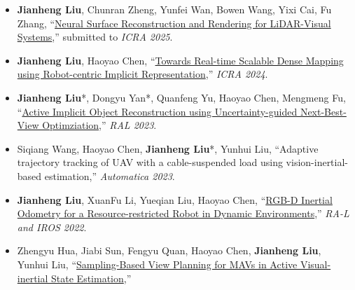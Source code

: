 %
%



\begin{itemize}
	\item \textbf{Jianheng Liu}, Chunran Zheng, Yunfei Wan, Bowen Wang, Yixi Cai, Fu Zhang, ``\href{https://github.com/hku-mars/M2Mapping}{Neural Surface Reconstruction and Rendering for LiDAR-Visual Systems},''
	submitted to \emph{ICRA 2025}.\\
	\vspace{-8pt}
	\item \textbf{Jianheng Liu}, Haoyao Chen, ``\href{https://github.com/HITSZ-NRSL/RIM}{Towards Real-time Scalable Dense Mapping using Robot-centric Implicit Representation},''
	\emph{ICRA 2024}.\\
	\vspace{-8pt}
	\item \textbf{Jianheng Liu}*, Dongyu Yan*, Quanfeng Yu, Haoyao Chen, Mengmeng Fu, ``\href{https://arxiv.org/abs/2303.16739}{Active Implicit Object Reconstruction using Uncertainty-guided Next-Best-View Optimziation},''
	\emph{RAL 2023}.\\
	\vspace{-8pt}
	\item Siqiang Wang, Haoyao Chen, \textbf{Jianheng Liu}*, Yunhui Liu, ``Adaptive trajectory tracking of UAV with a cable-suspended load using vision-inertial-based estimation,''
	\emph{Automatica 2023}.\\
	\vspace{-8pt}
	\item \textbf{Jianheng Liu}, XuanFu Li, Yueqian Liu, Haoyao Chen, ``\href{https://github.com/HITSZ-NRSL/Dynamic-VINS}{RGB-D Inertial Odometry for a Resource-restricted Robot in Dynamic Environments},''
	\emph{RA-L and IROS 2022}.\\
	\vspace{-8pt}
	\item Zhengyu Hua, Jiabi Sun, Fengyu Quan, Haoyao Chen, \textbf{Jianheng Liu}, Yunhui Liu, ``\href{https://ieeexplore.ieee.org/abstract/document/9981941/}{Sampling-Based View Planning for MAVs in Active Visual-inertial State Estimation},''

\end{itemize}
